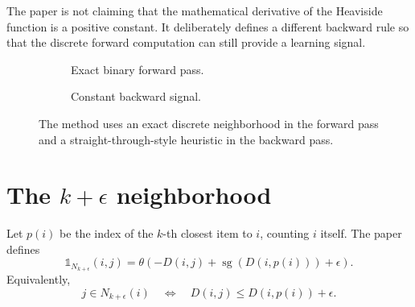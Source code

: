 \documentclass[11pt,oneside,openany]{book}
\theoremstyle{myplain}
\theoremstyle{definition}
\newcommand{\ind}{\mathds{1}}
\newcommand{\sg}{\operatorname{sg}}
\newcommand{\paperEq}[1]{\tag{P#1}}
\begin{document}
\begin{warningbox}[title=What the heuristic gradient does not mean]
The paper is not claiming that the mathematical derivative of the Heaviside function is a positive constant. It deliberately defines a different backward rule so that the discrete forward computation can still provide a learning signal.
\end{warningbox}


\begin{figure}[H]
\centering
\begin{subfigure}[t]{0.46\textwidth}
\centering
{}
\caption{Exact binary forward pass.}
\end{subfigure}\hfill
\begin{subfigure}[t]{0.46\textwidth}
\centering
{}
\caption{Constant backward signal.}
\end{subfigure}
\caption{The method uses an exact discrete neighborhood in the forward pass and a straight-through-style heuristic in the backward pass.}
\label{fig:heaviside}
\end{figure}

\section{The $k+\epsilon$ neighborhood}

Let $p(i)$ be the index of the $k$-th closest item to $i$, counting $i$ itself. The paper defines
\begin{equation*}
\ind_{N_{k+\epsilon}}(i,j)
=\theta\!\left(-D(i,j)+\sg(D(i,p(i)))+\epsilon\right).
\paperEq{2}
\label{eq:neighborhood}
\end{equation*}
Equivalently,
\[
  j\in N_{k+\epsilon}(i)
  \quad\Longleftrightarrow\quad
  D(i,j)\le D(i,p(i))+\epsilon.
\]
\end{document}
